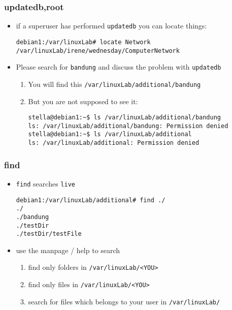 \documentclass[hyperref={pdfpagelabels=false}]{beamer}
\newcommand{\code}[1]{\colorbox{lGray}{\texttt{#1}}}
\begin{document}
		\begin{frame}[fragile]
			\frametitle{updatedb,root}
			\begin{itemize}
                \item<1-> if a superuser has performed \code{updatedb} you can locate things:
                    \begin{verbatim}
debian1:/var/linuxLab# locate Network
/var/linuxLab/irene/wednesday/ComputerNetwork
\end{verbatim}
                \item<2-> Please search for \code{bandung} and discuss the problem with \code{updatedb}
                \begin{enumerate}
                    \item<3-> You will find this \code{/var/linuxLab/additional/bandung}
                    \item<4-> But you are not supposed to see it:
                        \begin{verbatim}
stella@debian1:~$ ls /var/linuxLab/additional/bandung
ls: /var/linuxLab/additional/bandung: Permission denied
stella@debian1:~$ ls /var/linuxLab/additional
ls: /var/linuxLab/additional: Permission denied
\end{verbatim}
                \end{enumerate}
            \end{itemize}
		\end{frame}
		\begin{frame}[fragile]
			\frametitle{find}
			\begin{itemize}
                \item<1-> \code{find} searches \texttt{live}
                    \begin{verbatim}
debian1:/var/linuxLab/additional# find ./
./
./bandung
./testDir
./testDir/testFile
\end{verbatim}
                \item<2-> use the manpage / help to search
                \begin{enumerate}
                    \item<2-> find only folders in \code{/var/linuxLab/\textless YOU\textgreater}
                    \item<3-> find only files in \code{/var/linuxLab/\textless YOU\textgreater}
                    \item<4-> search for files which belongs to your user in \code{/var/linuxLab/}
                \end{enumerate}
            \end{itemize}
		\end{frame}
\end{document}
